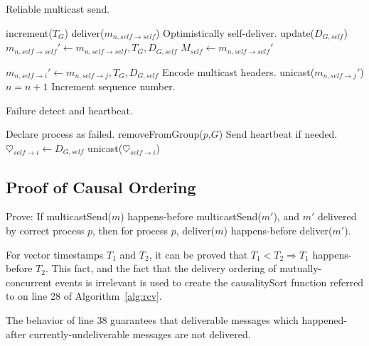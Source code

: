 \documentclass[conference]{IEEEtran}
\begin{document}
\begin{algorithm}
\caption{Reliable multicast send.}
\label{alg:send}
\begin{algorithmic}[1]
\State increment($T_G$)
\State deliver($m_{n,self \to self}$) \Comment Optimistically self-deliver.
\State update($D_{G,self}$) 
\State $m_{n,self \to self}' \leftarrow m_{n,self \to self}, T_G, D_{G,self}$
\State $M_{self} \leftarrow m_{n,self \to self}'$

	\State $m_{n,self \to i}' \leftarrow m_{n,self \to j}, T_G, D_{G,self}$
    \Comment Encode multicast headers.
	\State unicast($m_{n,self \to j}'$)
\EndFor
\State $n=n+1$ \Comment Increment sequence number.
\EndProcedure
\end{algorithmic}
\end{algorithm}

\begin{algorithm}
\caption{Failure detect and heartbeat.}
\label{alg:failure}
\begin{algorithmic}[1]
\Repeat
			\Comment Declare process as failed.
			\State removeFromGroup($p$,$G$)
			\Comment Send heartbeat if needed.
			\State $\heartsuit_{self \to i} \leftarrow D_{G,self}$
			\State unicast($\heartsuit_{self \to i}$)
		\EndIf
	\EndFor
{}
\EndProcedure
\end{algorithmic}
\end{algorithm}

\subsection{Proof of Causal Ordering}
Prove: If multicastSend($m$) happens-before multicastSend($m'$), and $m'$ delivered by correct process $p$, then for process $p$, deliver($m$) happens-before deliver($m'$).

For vector timestamps $T_1$ and $T_2$, it can be proved that $T_1 < T_2 \Rightarrow T_1$ happens-before $T_2$. This fact, and the fact that the delivery ordering of mutually-concurrent events is irrelevant is used to create the causalitySort function referred to on line 28 of Algorithm~\ref{alg:rcv}.

The behavior of line 38 guarantees that deliverable messages which happened-after currently-undeliverable messages are not delivered.
\end{document}
